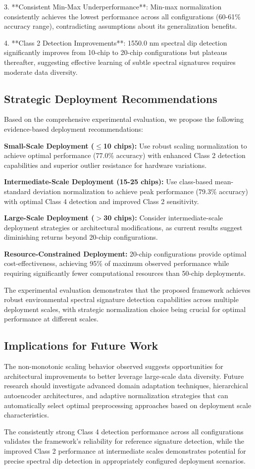 3. **Consistent Min-Max Underperformance**: Min-max normalization consistently achieves the lowest performance across all configurations (60-61\% accuracy range), contradicting assumptions about its generalization benefits.

4. **Class 2 Detection Improvements**: 1550.0 nm spectral dip detection significantly improves from 10-chip to 20-chip configurations but plateaus thereafter, suggesting effective learning of subtle spectral signatures requires moderate data diversity.

\subsection{Strategic Deployment Recommendations}

Based on the comprehensive experimental evaluation, we propose the following evidence-based deployment recommendations:

\textbf{Small-Scale Deployment ($\leq$10 chips):} Use robust scaling normalization to achieve optimal performance (77.0\% accuracy) with enhanced Class 2 detection capabilities and superior outlier resistance for hardware variations.

\textbf{Intermediate-Scale Deployment (15-25 chips):} Use class-based mean-standard deviation normalization to achieve peak performance (79.3\% accuracy) with optimal Class 4 detection and improved Class 2 sensitivity.

\textbf{Large-Scale Deployment ($>$30 chips):} Consider intermediate-scale deployment strategies or architectural modifications, as current results suggest diminishing returns beyond 20-chip configurations.

\textbf{Resource-Constrained Deployment:} 20-chip configurations provide optimal cost-effectiveness, achieving 95\% of maximum observed performance while requiring significantly fewer computational resources than 50-chip deployments.

The experimental evaluation demonstrates that the proposed framework achieves robust environmental spectral signature detection capabilities across multiple deployment scales, with strategic normalization choice being crucial for optimal performance at different scales.

\subsection{Implications for Future Work}

The non-monotonic scaling behavior observed suggests opportunities for architectural improvements to better leverage large-scale data diversity. Future research should investigate advanced domain adaptation techniques, hierarchical autoencoder architectures, and adaptive normalization strategies that can automatically select optimal preprocessing approaches based on deployment scale characteristics.

The consistently strong Class 4 detection performance across all configurations validates the framework's reliability for reference signature detection, while the improved Class 2 performance at intermediate scales demonstrates potential for precise spectral dip detection in appropriately configured deployment scenarios.